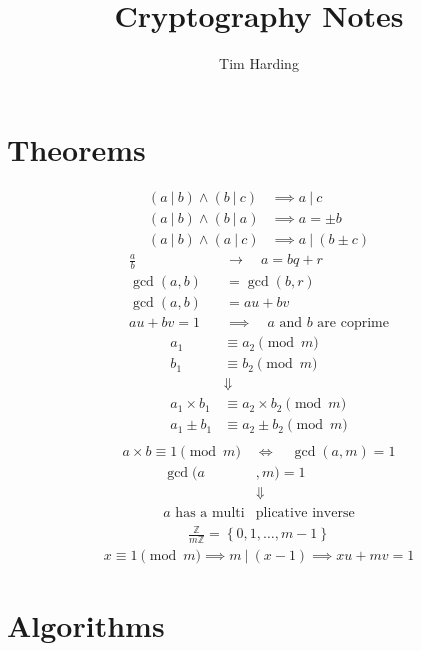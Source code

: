 \documentclass{article}
\title{Cryptography Notes}
\author{Tim Harding}
\newcommand{\curly}[1]{\left\{ #1 \right\}}
\begin{document}
\begin{multicols*}{2}

\section*{Theorems}

\begin{align*}
    (a\ |\ b) \wedge (b\ |\ c) &\implies a\ |\ c \\
    (a\ |\ b) \wedge (b\ |\ a) &\implies a = \pm b \\
    (a\ |\ b) \wedge (a\ |\ c) &\implies a\ |\ (b \pm c)
\end{align*}
\begin{align*}
    \frac{a}{b} \quad &\longrightarrow  \quad a = bq + r \\
    \gcd(a, b) &= \gcd(b, r) \\
    \gcd(a, b) &= au + bv \\
    au + bv = 1 \quad &\implies \quad \text{$a$ and $b$ are coprime}
\end{align*}
\begin{align*}
    a_1 &\equiv a_2 \pmod{m} \\
    b_1 &\equiv b_2 \pmod{m} \\
    &\Downarrow \\
    a_1 \times b_1 &\equiv a_2 \times b_2 \pmod{m} \\
    a_1 \pm b_1 &\equiv a_2 \pm b_2 \pmod{m} \\
\end{align*}
\begin{align*}
    a \times b \equiv 1 \pmod{m} \quad \Leftrightarrow \quad \gcd(a, m) = 1
\end{align*}
\begin{align*}
    \gcd(a&, m) = 1 \\
    &\Downarrow \\
    \text{$a$ has a multi} & \text{plicative inverse}
\end{align*}
\begin{align*}
    \frac{\mathbb{Z}}{m\mathbb{Z}} = \curly{0, 1, \ldots, m - 1}
\end{align*}
\begin{align*}
    x \equiv 1 \pmod{m} \implies m\ |\ (x - 1) \implies xu + mv = 1
\end{align*}

\section*{Algorithms}


\end{multicols*}
\end{document}
